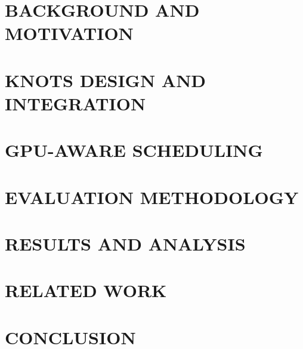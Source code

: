 \section{BACKGROUND AND MOTIVATION} 
\label{sec:motivation}

\section{KNOTS DESIGN AND INTEGRATION} 
\label{sec:modeling}

\section{GPU-AWARE SCHEDULING} 
\label{sec:scheme}

\section{EVALUATION METHODOLOGY}
\label{sec:methodology}

\section{RESULTS AND ANALYSIS} 
\label{sec:results}

\section{RELATED WORK} 
\label{sec:related}

\section{CONCLUSION} 
\label{sec:conclusion}







